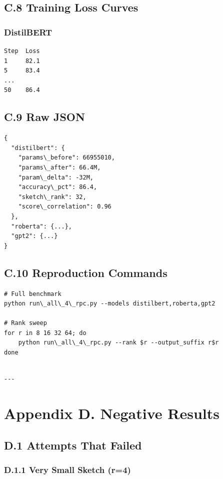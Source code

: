 \subsection{C.8 Training Loss Curves}

\subsubsection{DistilBERT}
\begin{lstlisting}
Step  Loss
1     82.1
5     83.4
...
50    86.4
\end{lstlisting}

\subsection{C.9 Raw JSON}

\begin{lstlisting}
{
  "distilbert": {
    "params\_before": 66955010,
    "params\_after": 66.4M,
    "param\_delta": -32M,
    "accuracy\_pct": 86.4,
    "sketch\_rank": 32,
    "score\_correlation": 0.96
  },
  "roberta": {...},
  "gpt2": {...}
}
\end{lstlisting}

\subsection{C.10 Reproduction Commands}

\begin{lstlisting}
# Full benchmark
python run\_all\_4\_rpc.py --models distilbert,roberta,gpt2

# Rank sweep
for r in 8 16 32 64; do
    python run\_all\_4\_rpc.py --rank $r --output_suffix r$r
done
\end{lstlisting}
\begin{lstlisting}

---
\end{lstlisting}


\section{Appendix D. Negative Results}

\subsection{D.1 Attempts That Failed}

\subsubsection{D.1.1 Very Small Sketch (r=4)}

